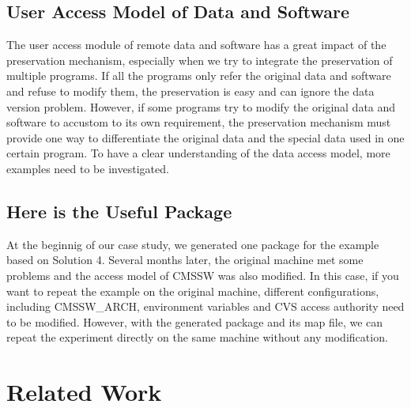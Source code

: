 \documentclass{acm_proc_article-sp}
\begin{document}
\subsection{User Access Model of Data and Software}

The user access module of remote data
and software has a great impact of the preservation mechanism, especially when
we try to integrate the preservation of multiple programs. If all the programs
only refer the original data and software and refuse to modify them, the
preservation is easy and can ignore the data version problem. However, if some
programs try to modify the original data and software to accustom to its own
requirement, the preservation mechanism must provide one way to differentiate
the original data and the special data used in one certain
program. To have a clear understanding of the data access model, more examples
need to be investigated.

\subsection{Here is the Useful Package}

At the beginnig of our case study, we generated one package for the
example based on Solution 4. Several months later, the original machine met
some problems and the access model of CMSSW was also modified. In this case, if
you want to repeat the example on the original machine, different 
configurations, including CMSSW\_ARCH, environment variables and CVS access
authority need to be modified. However, with the generated package and its map file, we can repeat the experiment directly on the same machine without any modification.

\section{Related Work }
\end{document}
